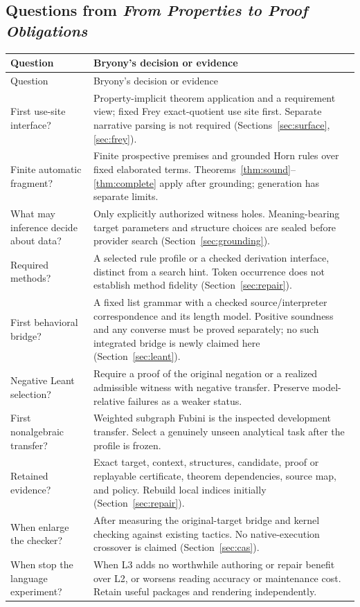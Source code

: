 \documentclass[11pt,a4paper]{article}
\theoremstyle{definition}\newtheorem{definition}[theorem]{Definition}
\theoremstyle{remark}\newtheorem{remark}[theorem]{Remark}
\begin{document}
\subsection{Questions from \emph{From Properties to Proof Obligations}}
\begingroup\small
\begin{longtable}{@{}P{.28\textwidth}P{.66\textwidth}@{}}
\toprule Question & Bryony's decision or evidence\\\midrule\endfirsthead
\toprule Question & Bryony's decision or evidence\\\midrule\endhead
\bottomrule\endfoot
First use-site interface? & Property-implicit theorem application and a requirement view; fixed Frey exact-quotient use site first. Separate narrative parsing is not required (Sections~\ref{sec:surface}, \ref{sec:frey}).\\
Finite automatic fragment? & Finite prospective premises and grounded Horn rules over fixed elaborated terms. Theorems~\ref{thm:sound}--\ref{thm:complete} apply after grounding; generation has separate limits.\\
What may inference decide about data? & Only explicitly authorized witness holes. Meaning-bearing target parameters and structure choices are sealed before provider search (Section~\ref{sec:grounding}).\\
Required methods? & A selected rule profile or a checked derivation interface, distinct from a search hint. Token occurrence does not establish method fidelity (Section~\ref{sec:repair}).\\
First behavioral bridge? & A fixed list grammar with a checked source/interpreter correspondence and its length model. Positive soundness and any converse must be proved separately; no such integrated bridge is newly claimed here (Section~\ref{sec:leant}).\\
Negative Leant selection? & Require a proof of the original negation or a realized admissible witness with negative transfer. Preserve model-relative failures as a weaker status.\\
First nonalgebraic transfer? & Weighted subgraph Fubini is the inspected development transfer. Select a genuinely unseen analytical task after the profile is frozen.\\
Retained evidence? & Exact target, context, structures, candidate, proof or replayable certificate, theorem dependencies, source map, and policy. Rebuild local indices initially (Section~\ref{sec:repair}).\\
When enlarge the checker? & After measuring the original-target bridge and kernel checking against existing tactics. No native-execution crossover is claimed (Section~\ref{sec:cas}).\\
When stop the language experiment? & When L3 adds no worthwhile authoring or repair benefit over L2, or worsens reading accuracy or maintenance cost. Retain useful packages and rendering independently.\\
\end{longtable}
\endgroup
\end{document}
